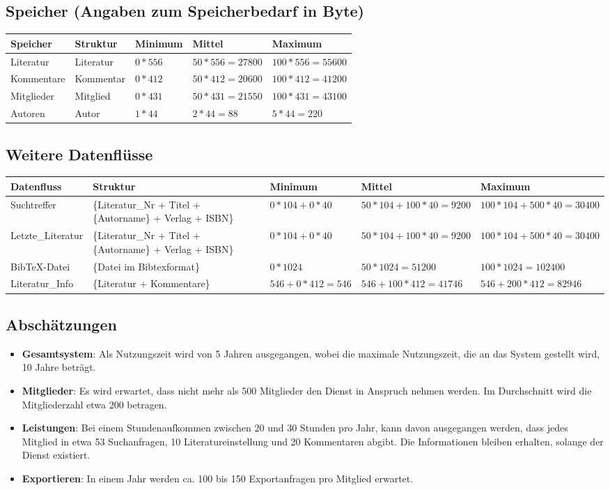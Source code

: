 \subsection{Speicher (Angaben zum Speicherbedarf in Byte)}
\begin{tabular}[ht]{|l|l|l|l|l|}
\hline
Speicher & Struktur & Minimum & Mittel & Maximum \\
\hline\hline
Literatur & {Literatur} & $0*556$ & $50*556=27800$ & $100*556=55600$ \\
Kommentare & {Kommentar} & $0*412$ & $50*412=20600$ & $100*412=41200$ \\
Mitglieder & {Mitglied}  & $0*431$ & $50*431=21550$ & $100*431=43100$ \\
Autoren & {Autor} & $1*44$ & $2*44=88$ & $5*44=220$ \\ 
\hline
\end{tabular}

\subsection{Weitere Datenflüsse}
\begin{tabular}[ht]{|l|p{4cm}|p{2cm}|p{2cm}|p{2cm}|}
\hline
Datenfluss & Struktur & Minimum & Mittel & Maximum \\
\hline\hline

Suchtreffer & \{Literatur\_Nr + Titel + \{Autorname\} + Verlag + ISBN\}  & $0*104 + 0*40$ & $50*104 + 100*40=9200$ & $100*104 + 500*40=30400$ \\
Letzte\_Literatur & \{Literatur\_Nr + Titel + \{Autorname\} + Verlag + ISBN\}  & $0*104 + 0*40$ & $50*104 + 100*40=9200$ & $100*104 + 500*40=30400$ \\
BibTeX-Datei & \{Datei im Bibtexformat\} & $0*1024$ & $50*1024=51200$ & $100*1024=102400$ \\
Literatur\_Info & \{Literatur + Kommentare\} & $546 + 0*412=546$ & $546 + 100*412=41746$ & $546 + 200*412=82946$ \\
\hline
\end{tabular}

\subsection{Abschätzungen}
\begin{itemize}
 \item \textbf{Gesamtsystem}: Als Nutzungszeit wird von 5 Jahren ausgegangen, wobei die maximale Nutzungszeit, 
die an das System gestellt wird, 10 Jahre betr\"agt.
 \item \textbf{Mitglieder}: Es wird erwartet, dass nicht mehr als 500 Mitglieder den Dienst in Anspruch nehmen werden. Im Durchschnitt wird
 die Mitgliederzahl etwa 200 betragen.
\item \textbf{Leistungen}: Bei einem Stundenaufkommen zwischen 20 und 30 Stunden pro Jahr, kann davon ausgegangen werden, dass jedes 
Mitglied in etwa 53 Suchanfragen, 10 Literatureinstellung und 20 Kommentaren abgibt. Die Informationen bleiben erhalten, solange der Dienst existiert.  
\item \textbf{Exportieren}: In einem Jahr werden ca. 100 bis 150 Exportanfragen pro Mitglied erwartet.
\end{itemize}

